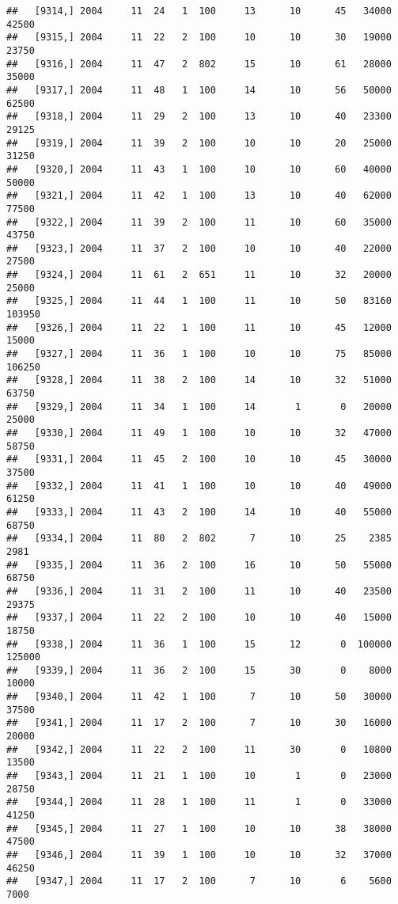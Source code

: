 \documentclass{article}\usepackage[]{graphicx}\usepackage[]{color}
\makeatletter
\newenvironment{kframe}{%
 \def\at@end@of@kframe{}%
 \ifinner\ifhmode%
  \def\at@end@of@kframe{\end{minipage}}%
  \begin{minipage}{\columnwidth}%
 \fi\fi%
 \def\FrameCommand##1{\hskip\@totalleftmargin \hskip-\fboxsep
 \colorbox{shadecolor}{##1}\hskip-\fboxsep
     \hskip-\linewidth \hskip-\@totalleftmargin \hskip\columnwidth}%
 \MakeFramed {\advance\hsize-\width
   \@totalleftmargin\z@ \linewidth\hsize
   \@setminipage}}%
 {\par\unskip\endMakeFramed%
 \at@end@of@kframe}
\newenvironment{knitrout}{}{} %
\makeatother
\begin{document}
\begin{knitrout}
\begin{kframe}
\begin{verbatim}
##   [9314,] 2004     11  24   1  100     13      10      45   34000   42500
##   [9315,] 2004     11  22   2  100     10      10      30   19000   23750
##   [9316,] 2004     11  47   2  802     15      10      61   28000   35000
##   [9317,] 2004     11  48   1  100     14      10      56   50000   62500
##   [9318,] 2004     11  29   2  100     13      10      40   23300   29125
##   [9319,] 2004     11  39   2  100     10      10      20   25000   31250
##   [9320,] 2004     11  43   1  100     10      10      60   40000   50000
##   [9321,] 2004     11  42   1  100     13      10      40   62000   77500
##   [9322,] 2004     11  39   2  100     11      10      60   35000   43750
##   [9323,] 2004     11  37   2  100     10      10      40   22000   27500
##   [9324,] 2004     11  61   2  651     11      10      32   20000   25000
##   [9325,] 2004     11  44   1  100     11      10      50   83160  103950
##   [9326,] 2004     11  22   1  100     11      10      45   12000   15000
##   [9327,] 2004     11  36   1  100     10      10      75   85000  106250
##   [9328,] 2004     11  38   2  100     14      10      32   51000   63750
##   [9329,] 2004     11  34   1  100     14       1       0   20000   25000
##   [9330,] 2004     11  49   1  100     10      10      32   47000   58750
##   [9331,] 2004     11  45   2  100     10      10      45   30000   37500
##   [9332,] 2004     11  41   1  100     10      10      40   49000   61250
##   [9333,] 2004     11  43   2  100     14      10      40   55000   68750
##   [9334,] 2004     11  80   2  802      7      10      25    2385    2981
##   [9335,] 2004     11  36   2  100     16      10      50   55000   68750
##   [9336,] 2004     11  31   2  100     11      10      40   23500   29375
##   [9337,] 2004     11  22   2  100     10      10      40   15000   18750
##   [9338,] 2004     11  36   1  100     15      12       0  100000  125000
##   [9339,] 2004     11  36   2  100     15      30       0    8000   10000
##   [9340,] 2004     11  42   1  100      7      10      50   30000   37500
##   [9341,] 2004     11  17   2  100      7      10      30   16000   20000
##   [9342,] 2004     11  22   2  100     11      30       0   10800   13500
##   [9343,] 2004     11  21   1  100     10       1       0   23000   28750
##   [9344,] 2004     11  28   1  100     11       1       0   33000   41250
##   [9345,] 2004     11  27   1  100     10      10      38   38000   47500
##   [9346,] 2004     11  39   1  100     10      10      32   37000   46250
##   [9347,] 2004     11  17   2  100      7      10       6    5600    7000

\end{verbatim}
\end{kframe}
\end{knitrout}
\end{document}

